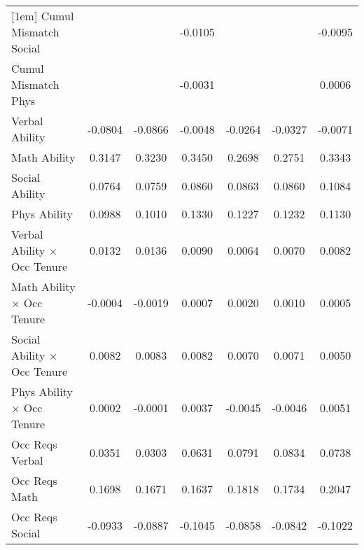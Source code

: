 {\begin{tabular}{l*{6}{c}}
[1em]
Cumul Mismatch Social&                     &                     &     -0.0105\sym{***}&                     &                     &     -0.0095\sym{**} \\
[1em]
Cumul Mismatch Phys &                     &                     &     -0.0031         &                     &                     &      0.0006         \\
[1em]
Verbal Ability      &     -0.0804\sym{***}&     -0.0866\sym{***}&     -0.0048         &     -0.0264         &     -0.0327         &     -0.0071         \\
[1em]
Math Ability        &      0.3147\sym{***}&      0.3230\sym{***}&      0.3450\sym{***}&      0.2698\sym{***}&      0.2751\sym{***}&      0.3343\sym{***}\\
[1em]
Social Ability      &      0.0764\sym{***}&      0.0759\sym{***}&      0.0860\sym{***}&      0.0863\sym{***}&      0.0860\sym{***}&      0.1084\sym{***}\\
[1em]
Phys Ability        &      0.0988\sym{***}&      0.1010\sym{***}&      0.1330\sym{***}&      0.1227\sym{***}&      0.1232\sym{***}&      0.1130\sym{***}\\
[1em]
Verbal Ability $\times$ Occ Tenure&      0.0132\sym{***}&      0.0136\sym{***}&      0.0090\sym{**} &      0.0064\sym{**} &      0.0070\sym{***}&      0.0082\sym{**} \\
[1em]
Math Ability $\times$ Occ Tenure&     -0.0004         &     -0.0019         &      0.0007         &      0.0020         &      0.0010         &      0.0005         \\
[1em]
Social Ability $\times$ Occ Tenure&      0.0082\sym{***}&      0.0083\sym{***}&      0.0082\sym{***}&      0.0070\sym{***}&      0.0071\sym{***}&      0.0050\sym{**} \\
[1em]
Phys Ability $\times$ Occ Tenure&      0.0002         &     -0.0001         &      0.0037         &     -0.0045\sym{***}&     -0.0046\sym{***}&      0.0051\sym{**} \\
[1em]
Occ Reqs Verbal     &      0.0351         &      0.0303         &      0.0631         &      0.0791         &      0.0834         &      0.0738         \\
[1em]
Occ Reqs Math       &      0.1698\sym{**} &      0.1671\sym{**} &      0.1637\sym{*}  &      0.1818\sym{***}&      0.1734\sym{***}&      0.2047\sym{***}\\
[1em]
Occ Reqs Social     &     -0.0933\sym{***}&     -0.0887\sym{***}&     -0.1045\sym{***}&     -0.0858\sym{***}&     -0.0842\sym{***}&     -0.1022\sym{***}\\

\end{tabular}}
